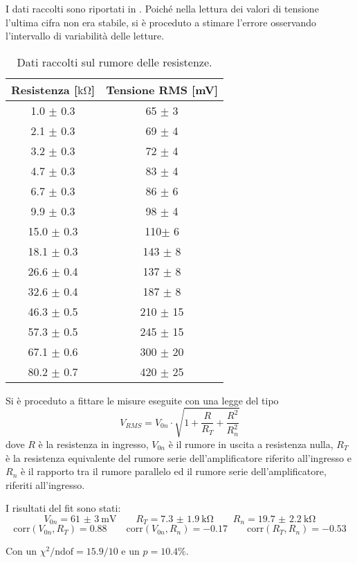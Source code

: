 I dati raccolti sono riportati in . Poiché nella lettura dei valori di tensione l'ultima cifra non era stabile, si è proceduto a stimare l'errore osservando l'intervallo di variabilità delle letture.

\begin{table}
	\centering
	\begin{tabular}{c c}
		\toprule
		Resistenza [$\si{\kilo\ohm}$] & Tensione RMS [\si{\milli\volt}]\\
		\midrule
		1.0 $\pm$ 0.3 & 65 $\pm$ 3\\
		2.1 $\pm$ 0.3 & 69 $\pm$ 4\\
		3.2 $\pm$ 0.3 & 72 $\pm$ 4\\
		4.7 $\pm$ 0.3 & 83 $\pm$ 4\\
		6.7 $\pm$ 0.3 & 86 $\pm$ 6\\
		9.9 $\pm$ 0.3 & 98 $\pm$ 4\\
		15.0 $\pm$ 0.3 & 110$\pm$ 6\\
		18.1 $\pm$ 0.3 & 143 $\pm$ 8\\
		26.6 $\pm$ 0.4 & 137 $\pm$ 8\\
		32.6 $\pm$ 0.4 & 187 $\pm$ 8\\
		46.3 $\pm$ 0.5 & 210 $\pm$ 15\\
		57.3 $\pm$ 0.5 & 245 $\pm$ 15\\
		67.1 $\pm$ 0.6 & 300 $\pm$ 20\\
		80.2 $\pm$ 0.7 & 420 $\pm$ 25\\
		\bottomrule
	\end{tabular}
	\caption{Dati raccolti sul rumore delle resistenze.}
	\label{tab:data}
\end{table}

Si è proceduto a fittare le misure eseguite con una legge del tipo
$$V_{RMS} = V_{0n} \cdot \sqrt{1+\frac{R}{R_T} + \frac{R^2}{R_n^2}}$$
dove $R$ è la resistenza in ingresso, $V_{0n}$ è il rumore in uscita a resistenza nulla, $R_T$ è la resistenza equivalente del rumore serie dell’amplificatore riferito all’ingresso e $R_n$ è il rapporto tra il rumore parallelo ed il rumore serie dell’amplificatore,
riferiti all’ingresso.

I risultati del fit sono stati:
$$V_{0n} = \SI{61(3)}{\milli\volt} \qquad R_T = \SI{7.3(19)}{\kilo\ohm} \qquad R_n = \SI{19.7(22)}{\kilo\ohm}$$
$$ \text{corr}(V_{0n},R_T)=0.88 \qquad \text{corr}(V_{0n},R_n)=-0.17 \qquad \text{corr}(R_T,R_n)=-0.53$$

Con un $\chi^2 / \text{ndof} = 15.9 / 10$ e un $p = 10.4 \%$.

